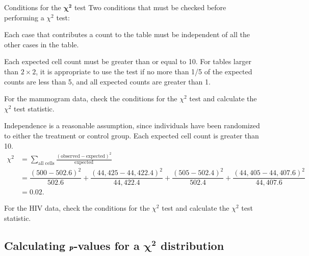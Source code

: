 \begin{onebox}{Conditions for the $\pmb{\chi^2}$ test}
Two conditions that must be checked before performing a $\chi^2$ test:
\begin{description}
\setlength{\itemsep}{0mm}
	\item[Independence.] Each case that contributes a count to the table must be independent of all the other cases in the table.
	\item[Sample size.] Each expected cell count must be greater than or equal to 10. For tables larger than $2 \times 2$, it is appropriate to use the test if no more than 1/5 of the expected counts are less than 5, and all expected counts are greater than 1.
\end{description}
\end{onebox}


\begin{examplewrap}
\begin{nexample}{For the mammogram data, check the conditions for the $\chi^2$ test and calculate the $\chi^2$ test statistic.}

Independence is a reasonable assumption, since individuals have been randomized to either the treatment or control group. Each expected cell count is greater than 10.
\begin{align*}
\chi^2 &= \sum_{\text{all cells}} \frac{(\text{observed} - \text{expected})^2}{\text{expected}} \\
&= \dfrac{(500 - 502.6)^2}{502.6} + \dfrac{(44,425 - 44,422.4)^2}{44,422.4} + \dfrac{(505 - 502.4)^2}{502.4} + \dfrac{(44,405 - 44,407.6)^2}{44,407.6} \\
&=0.02.
\end{align*}
\end{nexample}
\end{examplewrap}

\begin{exercisewrap}
\begin{nexercise}
For the HIV data, check the conditions for the $\chi^2$ test and calculate the $\chi^2$ test statistic.\footnotemark{}
\end{nexercise}
\end{exercisewrap}


\subsection{Calculating $\pmb{\MakeLowercase{p}}$-values for a $\pmb{\chi^2}$ distribution}

